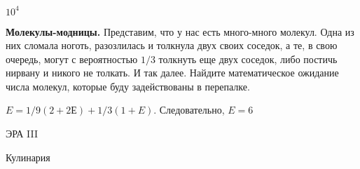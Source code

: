 \documentclass[12pt, addpoints]{exam} %
\begin{document}
\begin{questions}
\begin{solution}
$10^4 $
\end{solution}


\question \textbf{Молекулы-модницы.} Представим, что у нас есть много-много молекул. Одна из них сломала ноготь, разозлилась и толкнула двух своих соседок, а те, в свою очередь, могут с вероятностью $1/3$ толкнуть еще двух соседок, либо постичь нирвану и никого не толкать. И так далее. Найдите математическое ожидание числа молекул, которые буду задействованы в перепалке.

\begin{solution}
$E = 1/9(2 + 2Е) + 1/3(1 + E)$. Следовательно, $E = 6$
\end{solution}


\end{questions}


\newpage
\begin{center}
ЭРА III
\end{center}

\begin{center}
Кулинария
\end{center}
\end{document}

